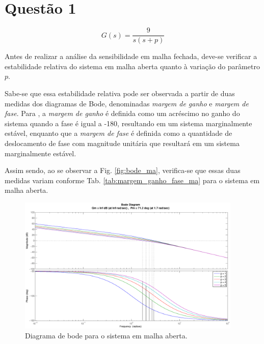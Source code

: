 \section*{Questão 1}

\begin{equation}\nonumber
G(s) = \frac{9}{s(s+p)}
\end{equation}


\vspace{0.5cm}


\vspace{0.25cm}

\noindent Antes de realizar a análise da sensibilidade em malha fechada, deve-se
verificar a estabilidade relativa do sistema em malha aberta quanto à variação
do parâmetro $p$. 

Sabe-se que essa estabilidade relativa pode ser observada a partir de duas
medidas dos diagramas de Bode, denominadas {\it margem de ganho} e {\it margem
de fase}. Para \cite{dorf}, a {\it margem de ganho} é definida como um acréscimo
no ganho do sistema quando a fase é igual a -180\textdegree, resultando em um
sistema marginalmente estável, enquanto que a {\it margem de fase} é definida
como a quantidade de deslocamento de fase com magnitude unitária que resultará
em um sistema marginalmente estável.

Assim sendo, ao se observar a Fig. \ref{fig:bode_ma}, verifica-se que essas duas
medidas variam conforme Tab. \ref{tab:margem_ganho_fase_ma} para o sistema em
malha aberta.

\begin{figure}[htb]
\centering
    \includegraphics[width=0.95\textwidth]{imgs/questao1/bode_ma}
    \caption{Diagrama de bode para o sistema em malha aberta.}
    \label{fig:diag_bode_sensib}
\end{figure}

